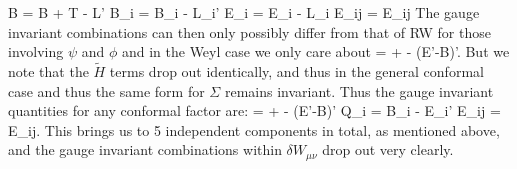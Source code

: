 \documentclass[10pt,letterpaper]{article}
\begin{document}
\ee
\be
	\tilde B = B + T - L'
\ee
\be
	\tilde B_i = B_i - L_i'
\ee
\be
	\tilde E_i = E_i - L_i
\ee
\be
	\tilde E_{ij} = E_{ij}
\ee
The gauge invariant combinations can then only possibly differ from that of RW for those involving $\psi$ and $\phi$ and in the Weyl case we only care about 
\be
	\Sigma = \phi + \psi - (E'-B)'.
\ee
But we note that the $\tilde H$ terms drop out identically, and thus in the general conformal case and thus the same form for $\Sigma$ remains invariant. Thus the gauge invariant quantities for any conformal factor are:
\be
	\Sigma = \phi + \psi - (E'-B)'
\ee
\be
	\mathcal Q_i = B_i - E_i'
\ee
\be
	E_{ij} = E_{ij}.
\ee
This brings us to 5 independent components in total, as mentioned above, and the gauge invariant combinations within $\delta W_{\mu\nu}$ drop out very clearly.
\end{document}
